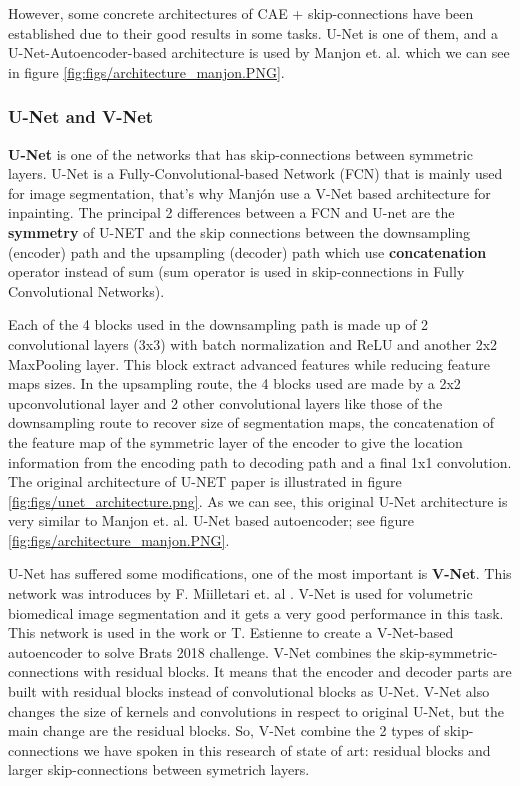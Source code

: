 However, some concrete architectures of CAE + skip-connections have been established due to their good results in some tasks. U-Net \cite{ronneberger2015unet} is one of them, and a U-Net-Autoencoder-based architecture is used by Manjon et. al. \cite{2020inpainting} which we can see in figure \ref{fig:figs/architecture_manjon.PNG}. 




\subsubsection{U-Net and V-Net}

\textbf{U-Net} \cite{ronneberger2015unet} is one of the networks that has skip-connections between symmetric layers. U-Net is a Fully-Convolutional-based Network (FCN) that is mainly used for image segmentation, that's why Manjón \cite{2020inpainting} use a V-Net based architecture for inpainting. The principal 2 differences between a FCN and U-net are the \textbf{symmetry} of U-NET and the skip connections between the downsampling (encoder) path and the upsampling (decoder) path which use \textbf{concatenation} operator instead of sum (sum operator is used in skip-connections in Fully Convolutional Networks).

Each of the 4 blocks used in the downsampling path is made up of 2 convolutional layers (3x3) with batch normalization and ReLU and another 2x2 MaxPooling layer. This block extract advanced features while reducing feature maps sizes. In the upsampling route, the 4 blocks used are made by a 2x2 upconvolutional layer and 2 other convolutional layers like those of the downsampling route to recover size of segmentation maps, the concatenation of the feature map of the symmetric layer of the encoder to give the location information from the encoding path to decoding path and a final 1x1 convolution. The original architecture of U-NET paper is illustrated in figure \ref{fig:figs/unet_architecture.png}. As we can see, this original U-Net architecture is very similar to Manjon et. al. U-Net based autoencoder; see figure \ref{fig:figs/architecture_manjon.PNG}.


U-Net has suffered some modifications, one of the most important is \textbf{V-Net}. This network was introduces by F. Miilletari et. al \cite{vnet}. V-Net is used for volumetric biomedical image segmentation and it gets a very good performance in this task. This network is used in the work or T. Estienne \cite{otherBraTS2020} to create a V-Net-based autoencoder to solve Brats 2018 challenge. V-Net combines the skip-symmetric-connections with residual blocks. It means that the encoder and decoder parts are built with residual blocks instead of convolutional blocks as U-Net. V-Net also changes the size of kernels and convolutions in respect to original U-Net, but the main change are the residual blocks. So, V-Net combine the 2 types of skip-connections we have spoken in this research of state of art: residual blocks and larger skip-connections between symetrich layers.



